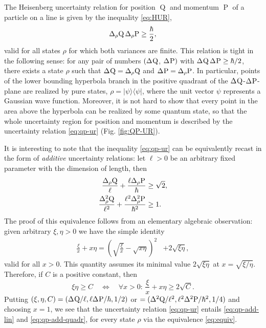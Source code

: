 The Heisenberg uncertainty relation for position $\operatorname{Q}$ and momentum $\operatorname{P}$ of a particle on a line is given by the inequality \eqref{eq:HUR},
\begin{equation}\label{eq:qp-ur}
  \sdevr{\opq}\,\sdevr{\opp}\ge\frac{\hbar}{2},
\end{equation}
valid for all states $\rho$ for which both variances are finite. This relation
is tight  in the following sense: for any pair of numbers $(\sdev{\opq}$, $\sdev{\opp})$ with $\sdev{\opq}\,\sdev{\opp}\ge \hbar/2$, there exists a state $\rho$ such that $\sdev{\opq} =\sdevr{\opq}$ and $\sdev{\opp}=\sdevr{\opp}$.  In particular, points of the lower bounding hyperbola branch in the positive quadrant of the $\sdev{\opq}$-$\sdev{\opp}$-plane are realized by pure states, $\rho=|\psi\rangle\langle\psi|$, where the unit vector $\psi$ represents a Gaussian wave function. Moreover, it is not hard to show that every point in the area above the hyperbola can be realized by some quantum state, so that the whole uncertainty region for position and momentum is described by the uncertainty relation \eqref{eq:qp-ur} (Fig. \ref{fig:QP-UR}).

It is interesting to note that the inequality \eqref{eq:qp-ur}  can be equivalently recast  in the form of {\em additive} uncertainty relations: let $\ell>0$ be an arbitrary fixed parameter with the  dimension of length, then
\begin{align}
  \frac{\sdevr{\opq}}{\ell}+\frac{\ell\sdevr{\opp}}{\hbar}&\ge \sqrt2,\label{eq:qp-add-lin}\\
  \frac{\varr{\opq}}{\ell^2}+\frac{\ell^2\varr{\opp}}{\hbar^2}&\ge 1.\label{eq:qp-add-quadr}
\end{align}
The proof of this equivalence follows from an elementary algebraic observation: given arbitrary $\xi,\eta>0$ we have the simple identity
\begin{align}%
  \frac \xi x+x \eta=\left(\sqrt{\frac \xi x}-\sqrt{x \eta}\right)^2&+2\sqrt{\xi \eta},
\end{align}
valid for all $x>0$. This quantity assumes its  minimal value $2\sqrt{\xi \eta}$ at $x=\sqrt{\xi/ \eta}$. Therefore, if $C$ is a positive constant, then
\begin{equation}\label{eq:equiv}
  \xi\eta\ge C\quad\iff\quad\forall x>0:\,\frac\xi x+x\eta\ge 2\sqrt{C}.
\end{equation}
Putting
$(\xi,\eta,C)= (\sdev{\opq}/\ell,\ell\sdev{\opp}/\hbar,1/2)$ or $=(\var{\opq}/\ell^2,\ell^2\var{\opp}/\hbar^2,1/4)$ and choosing $x=1$, we see that the uncertainty relation \eqref{eq:qp-ur} entails  \eqref{eq:qp-add-lin} and \eqref{eq:qp-add-quadr}, for every state $\rho$ via the equivalence \eqref{eq:equiv}.

